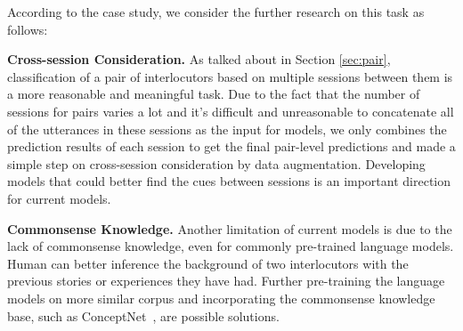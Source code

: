According to the case study, we consider the further research on this task as follows:

\textbf{Cross-session Consideration.} As talked about in Section \ref{sec:pair}, classification of a pair of interlocutors based on multiple sessions between them is a more reasonable and meaningful task. Due to the fact that the number of sessions for pairs varies a lot and it's difficult and unreasonable to concatenate all of the utterances in these sessions as the input for models, we only combines the prediction results of each session to get the final pair-level predictions and made a simple step on cross-session consideration by data augmentation. Developing models that could better find the cues between sessions is an important direction for current models.

\textbf{Commonsense Knowledge.} Another limitation of current models is due to the lack of commonsense knowledge, even for commonly pre-trained language models. Human can better inference the background of two interlocutors with the previous stories or experiences they have had. Further pre-training the language models on more similar corpus and incorporating the commonsense knowledge base, such as ConceptNet~\cite{SpeerCH17}, are possible solutions.
